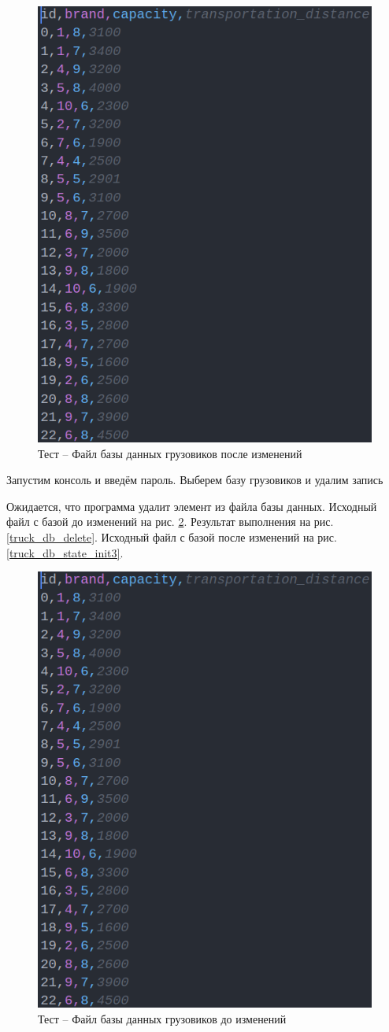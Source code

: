 \begin{figure}[H]
	\centering
	\includegraphics[width=0.7\linewidth]{photo/tests/admin/truck_db_state_edit}
	\caption{Тест -- Файл базы данных грузовиков после изменений}
	\label{truck_db_state_edit}
\end{figure}

Запустим консоль и введём пароль. 
Выберем базу грузовиков и удалим запись

Ожидается, что программа удалит элемент из файла базы данных.
Исходный файл с базой до изменений на рис. \ref{truck_db_state_edit2}.
Результат выполнения на рис. \ref{truck_db_delete}.
Исходный файл с базой после изменений на рис. \ref{truck_db_state_init3}.

\begin{figure}[H]
	\centering
	\includegraphics[width=0.7\linewidth]{photo/tests/admin/truck_db_state_edit}
	\caption{Тест -- Файл базы данных грузовиков до изменений}
	\label{truck_db_state_edit2}
\end{figure}

